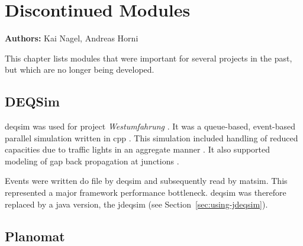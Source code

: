\chapter{Discontinued Modules}
\label{ch:discontinued}

\hfill \textbf{Authors:} Kai Nagel, Andreas Horni


This chapter lists modules that were important for several projects in the past, but which are no longer being developed.

\section{DEQSim}
\label{sec:deqsim}
\gls{deqsim} was used for project \emph{Westumfahrung} \citep[][]{BalmerEtAl_ResRep_bdktzrh_2009}. It was a queue-based, event-based parallel simulation written in \gls{cpp} \citep[][]{CharyparAxhausenEtAl2007Event-DrivenQueueBasedTraffic,Charypar_PhDThesis_2008}. This simulation included handling of reduced capacities due to traffic lights in an aggregate manner \citep[][p.139 ff]{Charypar_PhDThesis_2008}. It also supported modeling of gap back propagation at junctions \citep[][p.98 ff]{Charypar_PhDThesis_2008}.

Events were written do file by \gls{deqsim} and subsequently read by \gls{matsim}.  This represented a major framework performance bottleneck. \Gls{deqsim} was therefore replaced by a \gls{java} version, the \gls{jdeqsim} (see Section~\ref{sec:using-jdeqsim}).

\section{Planomat}
\label{sec:planomat}


